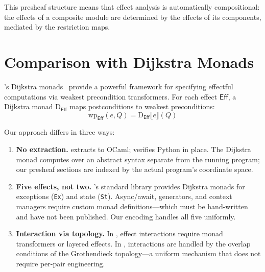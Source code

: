 \documentclass[11pt]{article}
\newcommand{\Eff}{\mathsf{Eff}}          %
\newcommand{\DMonad}{\mathrm{D}}         %
\newcommand{\wpre}{\mathrm{wp}}          %
\begin{document}
This presheaf structure means that effect analysis is automatically
compositional: the effects of a composite module are determined by
the effects of its components, mediated by the restriction maps.

\section{Comparison with Dijkstra Monads}\label{sec:dijkstra}

\Fstar{}'s Dijkstra monads~\cite{fstar-effects} provide a powerful
framework for specifying effectful computations via weakest
precondition transformers.  For each effect $\Eff$, a Dijkstra monad
$\DMonad_\Eff$ maps postconditions to weakest preconditions:
\[
  \wpre_\Eff(e, Q) = \DMonad_\Eff\llbracket e \rrbracket(Q)
\]

Our approach differs in three ways:

\begin{enumerate}[nosep]
\item \textbf{No extraction.}  \Fstar{} extracts to OCaml; \JuGeo{}
  verifies Python in place.  The Dijkstra monad computes over an
  abstract syntax separate from the running program; our presheaf
  sections are indexed by the actual program's coordinate space.

\item \textbf{Five effects, not two.}  \Fstar{}'s standard library
  provides Dijkstra monads for exceptions (\texttt{Ex}) and state
  (\texttt{St}).  Async/await, generators, and context managers require
  custom monad definitions---which must be hand-written and have not
  been published.  Our encoding handles all five uniformly.

\item \textbf{Interaction via topology.}  In \Fstar{}, effect
  interactions require monad transformers or layered effects.  In
  \JuGeo{}, interactions are handled by the overlap conditions of the
  Grothendieck topology---a uniform mechanism that does not require
  per-pair engineering.
\end{enumerate}
\end{document}
